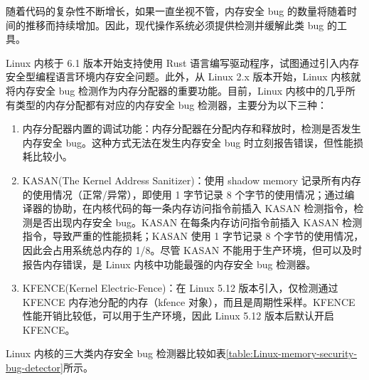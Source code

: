 \documentclass[AutoFakeBold]{LZUThesis}
\begin{document}
\begin{sloppypar}
随着代码的复杂性不断增长，如果一直坐视不管，内存安全 bug
的数量将随着时间的推移而持续增加。因此，现代操作系统必须提供检测并缓解此类
bug 的工具。

Linux 内核于 6.1 版本开始支持使用 Rust
语言编写驱动程序，试图通过引入内存安全型编程语言环境内存安全问题。此外，从
Linux 2.x 版本开始，Linux 内核就将内存安全 bug
检测作为内存分配器的重要功能。目前，Linux
内核中的几乎所有类型的内存分配都有对应的内存安全 bug
检测器，主要分为以下三种：

\begin{enumerate}
\def\labelenumi{\arabic{enumi}.}
\item
  内存分配器内置的调试功能：内存分配器在分配内存和释放时，检测是否发生内存安全
  bug。这种方式无法在发生内存安全 bug 时立刻报告错误，但性能损耗比较小。
\item
  KASAN(The Kernel Address Sanitizer)：使用 shadow memory
  记录所有内存的使用情况（正常/异常），即使用 1 字节记录 8
  个字节的使用情况；通过编译器的协助，在内核代码的每一条内存访问指令前插入
  KASAN 检测指令，检测是否出现内存安全 bug。KASAN
  在每条内存访问指令前插入 KASAN 检测指令，导致严重的性能损耗；KASAN
  使用 1 字节记录 8 个字节的使用情况，因此会占用系统总内存的 1/8。尽管
  KASAN 不能用于生产环境，但可以及时报告内存错误，是 Linux
  内核中功能最强的内存安全 bug 检测器。
\item
  KFENCE(Kernel Electric-Fence)：在 Linux 5.12 版本引入，仅检测通过
  KFENCE 内存池分配的内存（kfence 对象），而且是周期性采样。KFENCE
  性能开销比较低，可以用于生产环境，因此 Linux 5.12 版本后默认开启
  KFENCE。
\end{enumerate}

Linux 内核的三大类内存安全 bug 检测器比较如表\ref{table:Linux-memory-security-bug-detector}所示。


\end{sloppypar}
\end{document}
